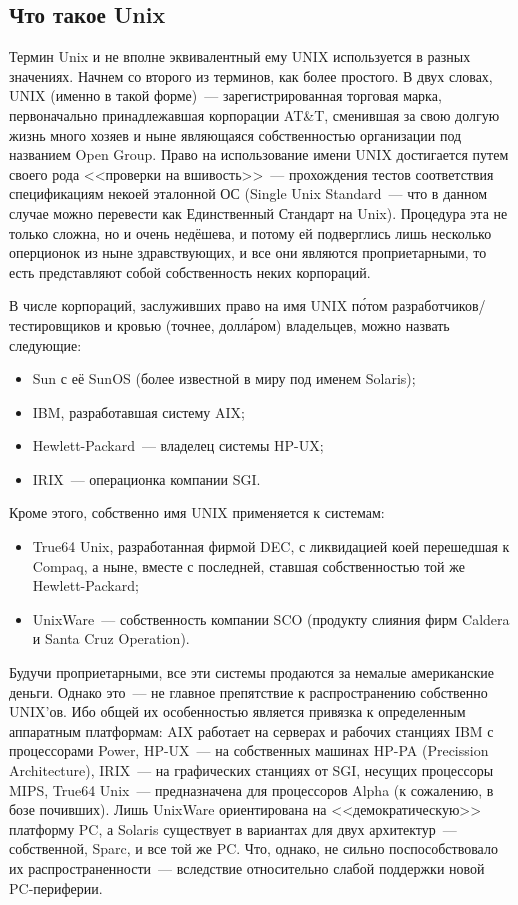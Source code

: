 \subsection{Что такое Unix}
Термин Unix и не вполне эквивалентный ему UNIX используется в разных значениях. Начнем со второго из терминов, как более простого. В двух словах, UNIX (именно в такой форме)~--- зарегистрированная торговая марка, первоначально принадлежавшая корпорации AT\&T, сменившая за свою долгую жизнь много хозяев и ныне являющаяся собственностью организации под названием Open Group. Право на использование имени UNIX достигается путем своего рода <<проверки на вшивость>>~--- прохождения тестов соответствия спецификациям некоей эталонной ОС (Single Unix Standard~--- что в данном случае можно перевести как Единственный Стандарт на Unix). Процедура эта не только сложна, но и очень недёшева, и потому ей подверглись лишь несколько оперционок из ныне здравствующих, и все они являются проприетарными, то есть представляют собой собственность неких корпораций.

В числе корпораций, заслуживших право на имя UNIX п\'{о}том разработчиков/тестировщиков и кровью (точнее, долл\'{а}ром) владельцев, можно назвать следующие:

\begin{itemize}
	\item Sun с её SunOS (более известной в миру под именем Solaris); 
	\item IBM, разработавшая систему AIX; 
	\item Hewlett-Packard~--- владелец системы HP-UX; 
	\item IRIX~--- операционка компании SGI. 
\end{itemize}

Кроме этого, собственно имя UNIX применяется к системам:

\begin{itemize}
	\item True64 Unix, разработанная фирмой DEC, с ликвидацией коей перешедшая к Compaq, а ныне, вместе с последней, ставшая собственностью той же Hewlett-Packard; 
	\item UnixWare~--- собственность компании SCO (продукту слияния фирм Caldera и Santa Cruz Operation). 
\end{itemize}

Будучи проприетарными, все эти системы продаются за немалые американские деньги. Однако это~--- не главное препятствие к распространению собственно UNIX'ов. Ибо общей их особенностью является привязка к определенным аппаратным платформам: AIX работает на серверах и рабочих станциях IBM с процессорами Power, HP-UX~--- на собственных машинах HP-PA (Precission Architecture), IRIX~--- на графических станциях от SGI, несущих процессоры MIPS, True64 Unix~--- предназначена для процессоров Alpha (к сожалению, в бозе почивших). Лишь UnixWare ориентирована на <<демократическую>> платформу PC, а Solaris существует в вариантах для двух архитектур~--- собственной, Sparc, и все той же PC. Что, однако, не сильно поспособствовало их распространенности~--- вследствие относительно слабой поддержки новой PC-периферии.

